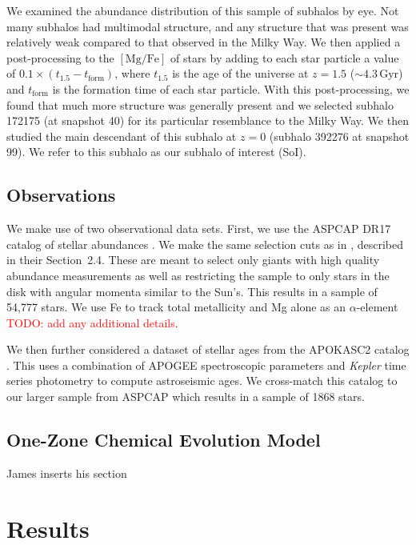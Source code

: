 \documentclass[linenumbers, twocolumn]{aastex631}
\newcommand{\Gyr}{\ensuremath{\textrm{Gyr}}}
\newcommand{\MgFe}{\ensuremath{[\textrm{Mg}/\textrm{Fe}]}}
\newcommand{\red}[1]{\textcolor{red}{#1}}
\begin{document}
We examined the abundance distribution of this sample of subhalos by eye. Not many subhalos had multimodal structure, and any structure that was present was relatively weak compared to that observed in the Milky Way. We then applied a post-processing to the \MgFe{} of stars by adding to each star particle a value of $0.1\times\left(t_{1.5}-t_{\textrm{form}}\right)$, where $t_{1.5}$ is the age of the universe at $z=1.5$ ($\sim4.3\,\Gyr$) and $t_{\textrm{form}}$ is the formation time of each star particle. With this post-processing, we found that much more structure was generally present and we selected subhalo 172175 (at snapshot 40) for its particular resemblance to the Milky Way. We then studied the main descendant of this subhalo at $z=0$ (subhalo 392276 at snapshot 99). We refer to this subhalo as our subhalo of interest (SoI).

\subsection{Observations}\label{ssec:obs}
We make use of two observational data sets. First, we use the ASPCAP DR17 catalog of stellar abundances \citep[][J.A.~Holtzman et al., in preparation]{2016AJ....151..144G}. We make the same selection cuts as in \citet{2024arXiv240707985B}, described in their Section~2.4. These are meant to select only giants with high quality abundance measurements as well as restricting the sample to only stars in the disk with angular momenta similar to the Sun's. This results in a sample of 54,777 stars. We use Fe to track total metallicity and Mg alone as an $\alpha$-element \red{TODO: add any additional details}.

We then further considered a dataset of stellar ages from the APOKASC2 catalog \citep{2018ApJS..239...32P}. This uses a combination of APOGEE spectroscopic parameters and \textit{Kepler} time series photometry to compute astroseismic ages. We cross-match this catalog to our larger sample from ASPCAP which results in a sample of 1868 stars.

\subsection{One-Zone Chemical Evolution Model}\label{ssec:onezone_met}
James inserts his section

\section{Results}\label{sec:results}
\end{document}
